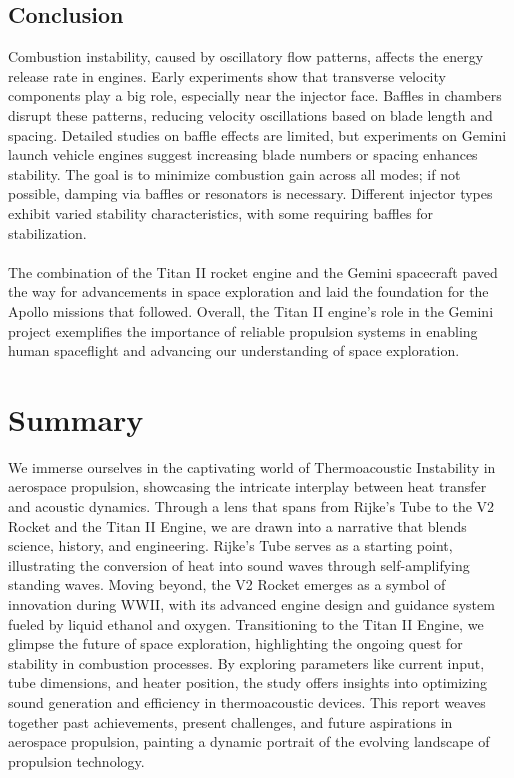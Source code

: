 \documentclass[8pt]{article} %
\begin{document}
\subsection{Conclusion}
Combustion instability, caused by oscillatory flow patterns, affects the energy release rate in engines. Early experiments show that transverse velocity components play a big role, especially near the injector face. Baffles in chambers disrupt these patterns, reducing velocity oscillations based on blade length and spacing.\cite{CI in LRE of NASA}  Detailed studies on baffle effects are limited, but experiments on Gemini launch vehicle engines suggest increasing blade numbers or spacing enhances stability. The goal is to minimize combustion gain across all modes; if not possible, damping via baffles or resonators is necessary. Different injector types exhibit varied stability characteristics, with some requiring baffles for stabilization.\\\\
The combination of the Titan II rocket engine and the Gemini spacecraft paved the way for advancements in space exploration and laid the foundation for the Apollo missions that followed.
Overall, the Titan II engine's role in the Gemini project exemplifies the importance of reliable propulsion systems in enabling human spaceflight and advancing our understanding of space exploration.

\section{Summary}
We immerse ourselves in the captivating world of Thermoacoustic Instability in aerospace propulsion, showcasing the intricate interplay between heat transfer and acoustic dynamics. Through a lens that spans from Rijke's Tube to the V2 Rocket and the Titan II Engine, we are drawn into a narrative that blends science, history, and engineering. Rijke's Tube serves as a starting point, illustrating the conversion of heat into sound waves through self-amplifying standing waves. Moving beyond, the V2 Rocket emerges as a symbol of innovation during WWII, with its advanced engine design and guidance system fueled by liquid ethanol and oxygen. Transitioning to the Titan II Engine, we glimpse the future of space exploration, highlighting the ongoing quest for stability in combustion processes. By exploring parameters like current input, tube dimensions, and heater position, the study offers insights into optimizing sound generation and efficiency in thermoacoustic devices. This report weaves together past achievements, present challenges, and future aspirations in aerospace propulsion, painting a dynamic portrait of the evolving landscape of propulsion technology.
\end{document}
